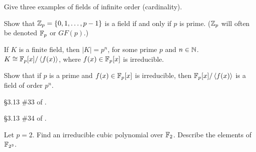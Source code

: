         \begin{problem} [10 points]
          Give three examples of fields of infinite order (cardinality).
        \end{problem}

        \begin{problem} [10 points]
          Show that $\mathbb{Z}_p = \{0, 1, \ldots, p-1\}$ is a field if and only if $p$ is prime. ($\mathbb{Z}_p$ will often be denoted $\mathbb{F}_p$ or $GF(p)$.)
        \end{problem}

        \begin{theorem}
          If $K$ is a finite field, then $|K| = p^n$, for some prime $p$ and $n\in\mathbb{N}$. $K \cong \mathbb{F}_p[x]/\left\langle f(x)\right\rangle$, where $f(x)\in\mathbb{F}_p[x]$ is irreducible.
        \end{theorem}

        \begin{problem} [20 points]
          Show that if $p$ is a prime and $f(x)\in\mathbb{F}_p[x]$ is irreducible, then $\mathbb{F}_p[x]/\left\langle f(x)\right\rangle$ is a field of order $p^n$.
        \end{problem}

	\begin{problem}[15 points]
		\S3.13 \#33 of \cite{tw}.
	\end{problem}

	\begin{problem}[10 points]
		\S3.13 \#34 of \cite{tw}.
	\end{problem}

        \begin{problem} [15 points]
          Let $p = 2$. Find an irreducible cubic polynomial over $\mathbb{F}_2$. Describe the elements of $\mathbb{F}_{2^3}$.
        \end{problem}
